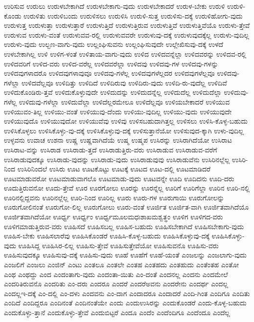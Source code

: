 {ಉರಿಸುವ
ಉರುಲು
ಉರುಳಬೇಕಾಗಿದೆ
ಉರುಳಬೇಕಾಗು-ವುದು
ಉರುಳಬೇಕಾದರೆ
ಉರುಳ-ಬೇಕು
ಉರುಳಿ
ಉರುಳಿ-ಕೊಂಡು
ಉರುಳಿತು
ಉರುಳಿಬಂದು
ಉರುಳಿಸಲು
ಉರುಳಿಸಿ
ಉರುಳಿ-ಸುತ್ತ
ಉರುಳಿಸು-ದಕ್ಕೆ
ಉರುಳಿಹೋಗು-ವುದು
ಉರುಳುತ್ತ
ಉರುಳುತ್ತಾ
ಉರುಳುತ್ತಾರೆ
ಉರುಳುತ್ತಿದೆ
ಉರುಳುತ್ತಿರುವ
ಉರುಳುತ್ತಿವೆ
ಉರುಳುತ್ತಿವೆಯೊ
ಉರುಳು-ತ್ತೇವೆ
ಉರುಳುವ
ಉರುಳು-ವಂತೆ
ಉರುಳುವವ-ರಲ್ಲಿ
ಉರುಳುವವರೇ
ಉರುಳುವು-ದಕ್ಕೆ
ಉರುಳುವುದಕ್ಕೆಲ್ಲ
ಉರುಳು-ವುದಿಲ್ಲ
ಉರುಳು-ವುದು
ಉಲ್ಬಣ-ವಾಗು-ವುದು
ಉಲ್ಲಂಘಿಸುವನು
ಉಲ್ಲಂಘಿಸುವುದೇ
ಉಲ್ಲೇಖಿಸುವು-ದಕ್ಕೆ
ಉಳದೆ
ಉಳಬೇಕಾಗಿಲ್ಲ
ಉಳಿ
ಉಳಿಗ-ಳಂತೆ
ಉಳಿತಾಯ-ವಾಗು-ವುದು
ಉಳಿದ
ಉಳಿದವನ್ನೆಲ್ಲಾ
ಉಳಿದವರನ್ನು
ಉಳಿದವ-ರಲ್ಲಿ
ಉಳಿದವರಿಗೆ
ಉಳಿದ-ವರು
ಉಳಿದ-ವರೆಲ್ಲ
ಉಳಿದವರೆಲ್ಲಾ
ಉಳಿದವು
ಉಳಿದವು-ಗಳ
ಉಳಿದವು-ಗಳನ್ನು
ಉಳಿದವುಗಳಾದರೊ
ಉಳಿದವುಗಳಾವುವೂ
ಉಳಿದವು-ಗಳೆಲ್ಲ
ಉಳಿದವುಗಳೆಲ್ಲದರ
ಉಳಿದವುಗಳೆಲ್ಲವೂ
ಉಳಿದವು-ಗಳೆಲ್ಲಾ
ಉಳಿದವೆಲ್ಲವೂ
ಉಳಿದಿತ್ತು
ಉಳಿದಿದೆ
ಉಳಿದಿರುವು
ಉಳಿದಿರು-ವುದು
ಉಳಿದಿ-ರು-ವುದೆಲ್ಲ
ಉಳಿದಿವೆ
ಉಳಿದುಕೊಂಡಿರು-ತ್ತವೆ
ಉಳಿದುಕೊಳ್ಳುವುದೇ
ಉಳಿದುದನ್ನು
ಉಳಿದುದನ್ನೆಲ್ಲ
ಉಳಿದುದೆಲ್ಲ
ಉಳಿದುದೆಲ್ಲಾ
ಉಳಿದುವು-ಗಳೆಲ್ಲ
ಉಳಿದುವು-ಗಳೆಲ್ಲಾ
ಉಳಿದುವೆಲ್ಲಾ
ಉಳಿದೆಲ್ಲರಮೇಲೂ
ಉಳಿದೆಲ್ಲವೂ
ಉಳಿಯಬೇಕಾದರೆ
ಉಳಿಯುವ
ಉಳಿಯುವಂ-ತಿಲ್ಲ
ಉಳಿಯು-ವಂತೆ
ಉಳಿಯುವು-ದೆಂದು
ಉಳಿಯು-ವುದಿಲ್ಲ
ಉಳಿಯು-ವುದು
ಉಳಿಯುವುದೇ
ಉಳಿಯುವುದೊ
ಉಳಿಯುವುದೋ
ಉಳಿಯುವೆವು
ಉಳಿವು
ಉಳಿಸಬಹುದಾಗಿತ್ತಲ್ಲ
ಉಳಿಸಲು
ಉಳಿಸಿ-ಕೊಳ್ಳ-ಬಹುದು
ಉಳಿಸಿಕೊಳ್ಳಲು
ಉಳಿಸಿಕೊಳ್ಳು-ವು-ದಕ್ಕೆ
ಉಳಿಸಿಕೊಳ್ಳುವು-ದಕ್ಕೆ
ಉಳಿಸುತ್ತಾನೆಯೋ
ಉಳಿಸುವುದ-ಕ್ಕಾಗಿ
ಉಳು-ವುದಿಲ್ಲ
ಉಳ್ಳವನು
ಉವಾಚ
ಉಶನಾ
ಉಷ್ಣ
ಉಷ್ಣವಾಗಿದೆಯೆ
ಉಷ್ಮ
ಉಷ್ಮಪ
ಉಸಿರನ್ನು
ಉಸಿರಾಗಿದೆಯೋ
ಉಸಿರಾಟ
ಉಸಿರಾಟ-ವನ್ನು
ಉಸಿರಾಡ
ಉಸಿರಾಡು-ತ್ತದೆ
ಉಸಿರಾಡುತ್ತಿರು-ವರು
ಉಸಿರಾಡುವ
ಉಸಿರಾಡುವ-ವರೆಗೆ
ಉಸಿರಾಡುವುದಕ್ಕೂ
ಉಸಿರಾಡು-ವುದನ್ನು
ಉಸಿರಾಡು-ವುದು
ಉಸಿರಾಡುವುವು
ಉಸಿರಾಡುವೆನು
ಉಸಿರಿನಲ್ಲೆಲ್ಲ
ಉಸಿರಿ-ನಿಂದ
ಉಸಿರಿನಿಂದಲೆ
ಉಸಿರು
ಊಟ
ಊಟಕೊಟ್ಟು
ಊಟಕ್ಕೆ
ಊಟದ
ಊಟ-ದಲ್ಲಿ
ಊಟಮಾಡಿದರೆ
ಊಟಮಾಡುವರೋ
ಊಟಮಾಡುವಾಗಲೊ
ಊಟಮಾಡು-ವುದು
ಊಟವನ್ನೇ
ಊದಿ
ಊದಿದನು
ಊದಿ-ದರು
ಊದುತ್ತಿರುವನೋ
ಊದು-ತ್ತೇವೆ
ಊರ
ಊರಗೋಲು
ಊರನ್ನು
ಊರನ್ನೆಲ್ಲ
ಊರಿಗೆ
ಊರಿಗೆಲ್ಲಾ
ಊರಿನ
ಊರಿ-ನಲ್ಲಿ
ಊರಿನಲ್ಲಿದ್ದವನು
ಊರಿನಲ್ಲೆಲ್ಲ
ಊರಿ-ನಿಂದ
ಊರಿಲ್ಲ
ಊರು
ಊರು-ಗಳ
ಊರುಗಾಯಿ
ಊರುಗೋಲನ್ನು
ಊರುಗೋಲಿನಂತೆ
ಊರುಗೋ-ಲಿಲ್ಲ
ಊರುಗೋಲು
ಊರು-ವಂತೆ
ಊರ್ಜಿತ
ಊರ್ಜಿತ-ವಾಗಿ
ಊರ್ಜಿತವಾಗಿದೆಯೊ
ಊರ್ಜಿತವಾಗಿದೆಯೋ
ಊರ್ಧ್ವ
ಊರ್ಧ್ವಂ
ಊರ್ಧ್ವಮೂಲಮಧಃಶಾಖಮಶ್ವತ್ಥಂ
ಊಳಿಗ
ಊಳಿಗದ-ವರು
ಊಳಿಗಮಾಡುತ್ತಿರುವ-ವರು
ಊಹಿಸದೆ
ಊಹಿಸಬಲ್ಲ
ಊಹಿಸ-ಬಹುದು
ಊಹಿಸಬೇಕಾಗಿದೆ
ಊಹಿಸಬೇಕಾಗು-ವುದು
ಊಹಿಸ-ಬೇಕು
ಊಹಿಸಲಾರೆವು
ಊಹಿಸಿಕೊಂಡರೆ
ಊಹಿಸಿ-ಕೊಳ್ಳ-ಬಹುದು
ಊಹಿಸಿಕೊಳ್ಳುವು-ದಕ್ಕೆ
ಊಹಿಸಿಕೊಳ್ಳು-ವುದು
ಊಹಿಸಿದ್ದ
ಊಹಿಸಿರ-ಲಿಲ್ಲ
ಊಹಿಸು-ತ್ತೇವೆ
ಊಹಿಸುತ್ತೇವೆಯೋ
ಊಹಿಸುವನೊ
ಊಹಿಸು-ವರು
ಊಹಿಸುವುದಕ್ಕೂ
ಊಹಿಸುವು-ದಕ್ಕೆ
ಊಹಿಸು-ವುದು
ಊಹೆ
ಊಹೆಗೆ
ಊಹೆ-ಯಂತೆ
ಎಂಜಲನ್ನು
ಎಂಜಲಾಗು-ವುದು
ಎಂಜಲಿಗೆ
ಎಂಜಲು
ಎಂಜಿನ್
ಎಂಟು
ಎಂತಲೂ
ಎಂತಲೇ
ಎಂತಹ
ಎಂತಹದು
ಎಂತಹುದು
ಎಂತೆಂತಹ
ಎಂತೋ
ಎಂಥ
ಎಂಥದ್ದು
ಎಂದ
ಎಂದಂತಾಗು-ವುದು
ಎಂದಂತಾ-ಯಿತು
ಎಂ-ದಂತೆ
ಎಂದನಲ್ಲ
ಎಂದನು
ಎಂದಮೇಲೆ
ಎಂದರಿತಿರುವನೊ
ಎಂದರಿತು
ಎಂ-ದರು
ಎಂದರೂ
ಎಂದರೆ
ಎಂದರೆಅವನು
ಎಂದರೇನು
ಎಂದರ್ಥ
ಎಂದಲ್ಲ
ಎಂದಲ್ಲಇ-ದಕ್ಕೆ
ಎಂ-ದಲ್ಲಿ
ಎಂ-ದಳು
ಎಂದವನು
ಎಂ-ದಾಗ
ಎಂದಾದರೂ
ಎಂದಾದರೆ
ಎಂದಿ-ಗಿಂತ
ಎಂದಿಗೂ
ಎಂದಿತು
ಎಂದಿದೆ
ಎಂದಿದ್ದರೂ
ಎಂದಿನಂತೆ
ಎಂದಿನಂತೆಯೇ
ಎಂದು
ಎಂದುಉಸಿರನ್ನು
ಎಂದುಕೊಂಡರೆ
ಎಂದು-ಕೊಳ್ಳ-ಬಹುದು
ಎಂದುಕೊಳ್ಳು-ತ್ತಾನೆ
ಎಂದುಕೊಳ್ಳು-ತ್ತೇವೆ
ಎಂದುಬಿಟ್ಟರೆ
ಎಂದೂ
ಎಂದೆಂ
ಎಂದೆಂದಿಗೂ
ಎಂದೆಂದೂ
ಎಂದೆಲ್ಲ
}
